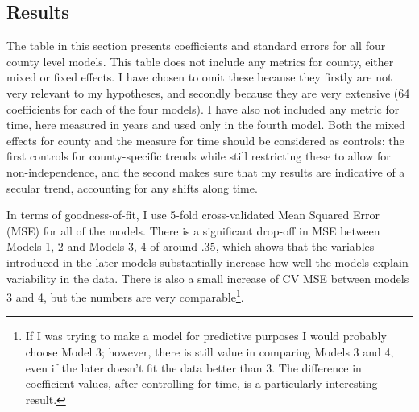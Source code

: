 \documentclass[12pt,twoside]{reedthesis}
\begin{document}
  \subsection{Results}\label{results}
  
  The table in this section presents coefficients and standard errors for
  all four county level models. This table does not include any metrics
  for county, either mixed or fixed effects. I have chosen to omit these
  because they firstly are not very relevant to my hypotheses, and
  secondly because they are very extensive (64 coefficients for each of
  the four models). I have also not included any metric for time, here
  measured in years and used only in the fourth model. Both the mixed
  effects for county and the measure for time should be considered as
  controls: the first controls for county-specific trends while still
  restricting these to allow for non-independence, and the second makes
  sure that my results are indicative of a secular trend, accounting for
  any shifts along time.
  
  In terms of goodness-of-fit, I use 5-fold cross-validated Mean Squared
  Error (MSE) for all of the models. There is a significant drop-off in
  MSE between Models 1, 2 and Models 3, 4 of around \(.35\), which shows
  that the variables introduced in the later models substantially increase
  how well the models explain variability in the data. There is also a
  small increase of CV MSE between models 3 and 4, but the numbers are
  very comparable\footnote{If I was trying to make a model for predictive
    purposes I would probably choose Model 3; however, there is still
    value in comparing Models 3 and 4, even if the later doesn't fit the
    data better than 3. The difference in coefficient values, after
    controlling for time, is a particularly interesting result.}.
  
\end{document}
